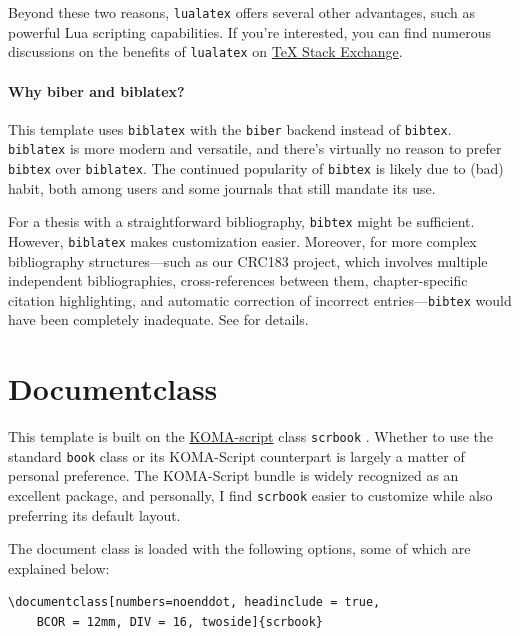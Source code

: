 Beyond these two reasons, \verb|lualatex| offers several other advantages, such as powerful Lua scripting capabilities. If you're interested, you can find numerous discussions on the benefits of \verb|lualatex| on \href{tex.stackexchange.com}{TeX Stack Exchange}.

\paragraph{Why biber and biblatex?}
This template uses \verb|biblatex| with the \verb|biber| backend instead of \verb|bibtex|. \verb|biblatex| is more modern and versatile, and there’s virtually no reason to prefer \verb|bibtex| over \verb|biblatex|. The continued popularity of \verb|bibtex| is likely due to (bad) habit, both among users and some journals that still mandate its use.

For a thesis with a straightforward bibliography, \verb|bibtex| might be sufficient. However, \verb|biblatex| makes customization easier. Moreover, for more complex bibliography structures---such as our CRC183 project, which involves multiple independent bibliographies, cross-references between them, chapter-specific citation highlighting, and automatic correction of incorrect entries---\verb|bibtex| would have been completely inadequate.
See  for details.

\section{Documentclass}
This template is built on the \href{https://ctan.org/pkg/koma-script?lang=de}{KOMA-script} class \verb|scrbook| \cite{koma_manual}. Whether to use the standard \verb|book| class or its KOMA-Script counterpart is largely a matter of personal preference. The KOMA-Script bundle is widely recognized as an excellent package, and personally, I find \verb|scrbook| easier to customize while also preferring its default layout.

The document class is loaded with the following options, some of which are explained below:
\begin{lstlisting}
\documentclass[numbers=noenddot, headinclude = true,
	BCOR = 12mm, DIV = 16, twoside]{scrbook}
\end{lstlisting}


